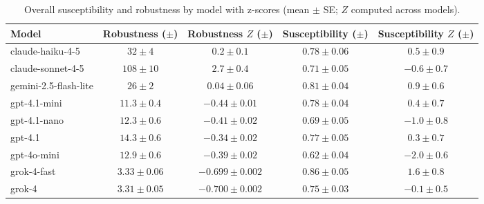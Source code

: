 \begin{table*}[t]
  \centering
  \caption{Overall susceptibility and robustness by model with z-scores (mean $\pm$ SE; $Z$ computed across models).}
  \label{tab:summary_by_model_with_z}
  \begin{tabular}{lcccc}
    \toprule
    Model & Robustness ($\pm$) & Robustness $Z$ ($\pm$) & Susceptibility ($\pm$) & Susceptibility $Z$ ($\pm$) \\
    \midrule
    claude-haiku-4-5 & $32\pm 4$ & $0.2\pm 0.1$ & $0.78\pm 0.06$ & $0.5\pm 0.9$ \\
    claude-sonnet-4-5 & $108\pm 10$ & $2.7\pm 0.4$ & $0.71\pm 0.05$ & $-0.6\pm 0.7$ \\
    gemini-2.5-flash-lite & $26\pm 2$ & $0.04\pm 0.06$ & $0.81\pm 0.04$ & $0.9\pm 0.6$ \\
    gpt-4.1-mini & $11.3\pm 0.4$ & $-0.44\pm 0.01$ & $0.78\pm 0.04$ & $0.4\pm 0.7$ \\
    gpt-4.1-nano & $12.3\pm 0.6$ & $-0.41\pm 0.02$ & $0.69\pm 0.05$ & $-1.0\pm 0.8$ \\
    gpt-4.1 & $14.3\pm 0.6$ & $-0.34\pm 0.02$ & $0.77\pm 0.05$ & $0.3\pm 0.7$ \\
    gpt-4o-mini & $12.9\pm 0.6$ & $-0.39\pm 0.02$ & $0.62\pm 0.04$ & $-2.0\pm 0.6$ \\
    grok-4-fast & $3.33\pm 0.06$ & $-0.699\pm 0.002$ & $0.86\pm 0.05$ & $1.6\pm 0.8$ \\
    grok-4 & $3.31\pm 0.05$ & $-0.700\pm 0.002$ & $0.75\pm 0.03$ & $-0.1\pm 0.5$ \\
    \bottomrule
  \end{tabular}
\end{table*}
